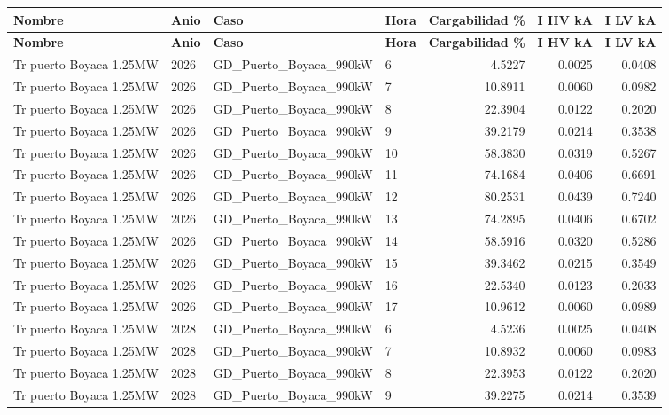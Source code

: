 \documentclass[11pt,a4paper]{article}
\begin{document}
\small
\begin{longtable}{llllrrr}
\toprule
\textbf{Nombre} & \textbf{Anio} & \textbf{Caso} & \textbf{Hora} & \textbf{Cargabilidad \%} & \textbf{I HV kA} & \textbf{I LV kA} \\
\midrule
\endfirsthead
\toprule
\textbf{Nombre} & \textbf{Anio} & \textbf{Caso} & \textbf{Hora} & \textbf{Cargabilidad \%} & \textbf{I HV kA} & \textbf{I LV kA} \\
\midrule
\endhead
\bottomrule
\endfoot
Tr puerto Boyaca 1.25MW & 2026 & GD\_Puerto\_Boyaca\_990kW & 6 & 4.5227 & 0.0025 & 0.0408 \\
Tr puerto Boyaca 1.25MW & 2026 & GD\_Puerto\_Boyaca\_990kW & 7 & 10.8911 & 0.0060 & 0.0982 \\
Tr puerto Boyaca 1.25MW & 2026 & GD\_Puerto\_Boyaca\_990kW & 8 & 22.3904 & 0.0122 & 0.2020 \\
Tr puerto Boyaca 1.25MW & 2026 & GD\_Puerto\_Boyaca\_990kW & 9 & 39.2179 & 0.0214 & 0.3538 \\
Tr puerto Boyaca 1.25MW & 2026 & GD\_Puerto\_Boyaca\_990kW & 10 & 58.3830 & 0.0319 & 0.5267 \\
Tr puerto Boyaca 1.25MW & 2026 & GD\_Puerto\_Boyaca\_990kW & 11 & 74.1684 & 0.0406 & 0.6691 \\
Tr puerto Boyaca 1.25MW & 2026 & GD\_Puerto\_Boyaca\_990kW & 12 & 80.2531 & 0.0439 & 0.7240 \\
Tr puerto Boyaca 1.25MW & 2026 & GD\_Puerto\_Boyaca\_990kW & 13 & 74.2895 & 0.0406 & 0.6702 \\
Tr puerto Boyaca 1.25MW & 2026 & GD\_Puerto\_Boyaca\_990kW & 14 & 58.5916 & 0.0320 & 0.5286 \\
Tr puerto Boyaca 1.25MW & 2026 & GD\_Puerto\_Boyaca\_990kW & 15 & 39.3462 & 0.0215 & 0.3549 \\
Tr puerto Boyaca 1.25MW & 2026 & GD\_Puerto\_Boyaca\_990kW & 16 & 22.5340 & 0.0123 & 0.2033 \\
Tr puerto Boyaca 1.25MW & 2026 & GD\_Puerto\_Boyaca\_990kW & 17 & 10.9612 & 0.0060 & 0.0989 \\
Tr puerto Boyaca 1.25MW & 2028 & GD\_Puerto\_Boyaca\_990kW & 6 & 4.5236 & 0.0025 & 0.0408 \\
Tr puerto Boyaca 1.25MW & 2028 & GD\_Puerto\_Boyaca\_990kW & 7 & 10.8932 & 0.0060 & 0.0983 \\
Tr puerto Boyaca 1.25MW & 2028 & GD\_Puerto\_Boyaca\_990kW & 8 & 22.3953 & 0.0122 & 0.2020 \\
Tr puerto Boyaca 1.25MW & 2028 & GD\_Puerto\_Boyaca\_990kW & 9 & 39.2275 & 0.0214 & 0.3539 \\

\end{longtable}
\end{document}
